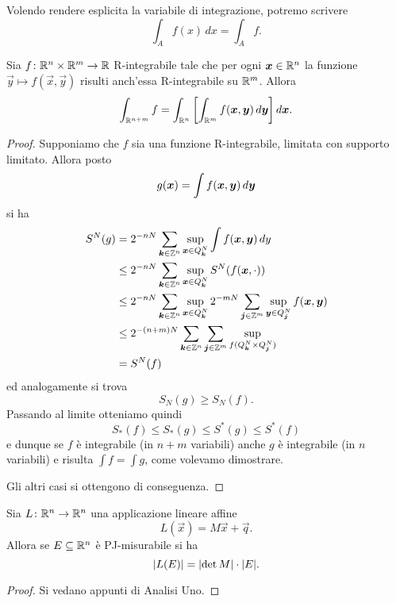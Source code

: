 Volendo rendere esplicita la variabile di integrazione, potremo 
scrivere 
\[
  \int_A f(x)\, dx = \int_A f.
\]


\begin{theorem}
Sia $f\colon \RR^n\times \RR^m \to \RR$ R-integrabile
tale che per ogni $\vec x\in \RR^n$ la funzione $\vec y \mapsto f(\vec x,\vec y)$ 
risulti anch'essa R-integrabile su $\RR^m$.
Allora 
\[
  \int_{\RR^{n+m}} f = \int_{\RR^n} \Enclose{\int_{\RR^m} f(\vec x, \vec y)\, d\vec y}\, d\vec x.
\]
\end{theorem}

\begin{proof}
Supponiamo che $f$ sia una funzione R-integrabile, 
limitata con supporto limitato.
Allora posto 
\[
    g(\vec x) = \int f(\vec x, \vec y)\, d\vec y\\
\]
si ha
\begin{align*}
    S^N(g)
    &= 2^{-nN} \sum_{\vec k\in \ZZ^n} 
        \sup_{\vec x\in Q^N_{\vec k}}
            \int f(\vec x,\vec y)\, dy\\
    &\le 2^{-nN} \sum_{\vec k\in \ZZ^n} 
        \sup_{\vec x\in Q^N_{\vec k}}
                S^N(f(\vec x,\cdot))\\
    &\le 2^{-nN} \sum_{\vec k\in \ZZ^n} 
        \sup_{\vec x\in Q^N_{\vec k}}
            2^{-mN} \sum_{\vec j \in \ZZ^m} 
                \sup_{\vec y \in Q^N_{\vec j}} 
                    f(\vec x, \vec y) \\
    &\le 2^{-(n+m)N} \sum_{\vec k\in \ZZ^n} 
        \sum_{\vec j \in \ZZ^m} 
            \sup_{f(Q^N_{\vec k}\times Q^N_{\vec j})}\\
    &= S^N(f)
\end{align*}
ed analogamente si trova
\[
    S_N(g) \ge S_N(f).
\]
Passando al limite otteniamo quindi 
\[
   S_*(f) \le S_*(g) \le S^*(g) \le S^*(f)
\]
e dunque se $f$ è integrabile (in $n+m$ variabili) anche $g$ è integrabile
(in $n$ variabili) 
e risulta $\int f = \int g$, come volevamo dimostrare.

Gli altri casi si ottengono di conseguenza.
\end{proof}

\begin{theorem}
  \label{th:geometria_determinante}
Sia $L\colon \RR^n\to \RR^n$ una applicazione lineare affine
\[
  L(\vec x) = M\vec x + \vec q.
\]
Allora se $E\subset \RR^n$ è PJ-misurabile si ha 
\[
  \abs{L(E)} = \abs{\det M} \cdot \abs{E}.
\]
\end{theorem}
\begin{proof}
Si vedano appunti di Analisi Uno.
\end{proof}

